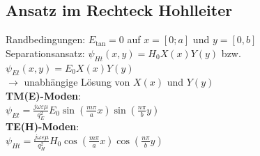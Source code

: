 \documentclass[english]{latex4ei/latex4ei_sheet}
\begin{document}
\begin{sectionbox}
	\subsection{Ansatz im Rechteck Hohlleiter}
	Randbedingungen: $E_{\text{tan}} = 0$ auf $x = [0;a]$ und $y = [0,b]$\\
	Separationsansatz: $\psi_{H t}(x, y)=H_{0} X(x) Y(y)$ bzw. $\psi_{E t}(x, y)=E_{0} X(x) Y(y)$\\
	$\rightarrow$ unabhängige Lösung von $X(x)$ und $Y(y)$\\

	\textbf{TM(E)-Moden}:\\
	$\psi_{E t}=\frac{j \omega \varepsilon \mu}{q_{E}^{2}} E_{0} \sin \left(\frac{m \pi}{a} x\right) \sin \left(\frac{n \pi}{b} y\right)$\\
	\textbf{TE(H)-Moden}:\\
	$\psi_{H t}=\frac{j \omega \varepsilon \mu}{q_{H}^{2}} H_{0} \cos \left(\frac{m \pi}{a} x\right) \cos \left(\frac{n \pi}{b} y\right)$\\
\end{sectionbox}
\end{document}
